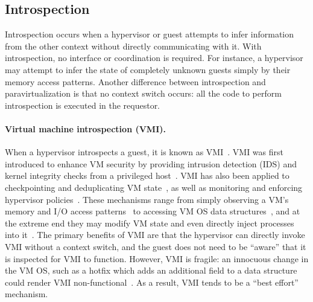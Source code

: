 \documentclass[11pt]{article}
\begin{document}
\subsection{Introspection}
Introspection occurs when a hypervisor or guest attempts to infer information from
the other context without directly communicating with it. With introspection, no
interface or coordination is required. For instance, a hypervisor may attempt to
infer the state of completely unknown guests simply by their memory access patterns.
Another difference between introspection and paravirtualization is that no context
switch occurs: all the code to perform introspection is executed in the requestor.

\paragraph{Virtual machine introspection (VMI).} When a hypervisor introspects a guest, it is known as VMI~\cite{garfinkel2003virtual}. 
VMI was first introduced to enhance VM security by 
providing intrusion detection (IDS) and kernel integrity checks from a privileged 
host~\cite{baliga2011detecting, fu2012space, garfinkel2003virtual}. 
VMI has also been applied to checkpointing and deduplicating VM state~\cite{aderholdt2014efficient}, 
as well as monitoring and enforcing hypervisor policies~\cite{ranadive2009ibmon}. 
These mechanisms range from simply observing a VM's memory and I/O access patterns~\cite{jones2006antfarm} 
to accessing VM OS data structures~\cite{case2010dynamic}, and at the extreme end they may modify VM state and 
even directly inject processes into it~\cite{gu2011process, chiueh2012surreptitious}. The primary benefits of 
VMI are that the hypervisor can directly invoke VMI without a context switch, 
and the guest does not need to be ``aware'' that it is inspected for VMI to function. 
However, VMI is fragile: an innocuous change in the VM OS, such as a hotfix which adds an additional
field to a data structure could render VMI non-functional~\cite{bahram2010dksm}.
As a result, VMI tends to be a ``best effort'' mechanism.
\end{document}
